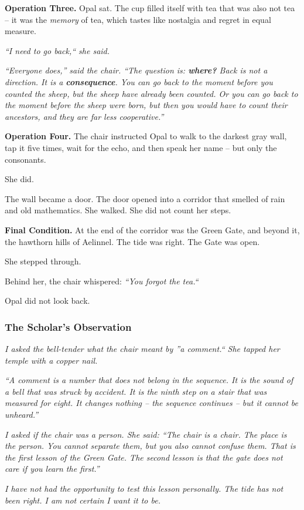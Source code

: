 \documentclass[12pt]{article}
\begin{document}
\textbf{Operation Three.} Opal sat. The cup filled itself with tea that was also not tea -- it was the \textit{memory} of tea, which tastes like nostalgia and regret in equal measure.

\textit{``I need to go back,`` she said.}

\textit{``Everyone does,'' said the chair. ``The question is: \textbf{where?} Back is not a direction. It is a \textbf{consequence}. You can go back to the moment before you counted the sheep, but the sheep have already been counted. Or you can go back to the moment before the sheep were born, but then you would have to count their ancestors, and they are far less cooperative.''}

\textbf{Operation Four.} The chair instructed Opal to walk to the darkest gray wall, tap it five times, wait for the echo, and then speak her name -- but only the consonants.

She did.

The wall became a door. The door opened into a corridor that smelled of rain and old mathematics. She walked. She did not count her steps.

\textbf{Final Condition.} At the end of the corridor was the Green Gate, and beyond it, the hawthorn hills of Aelinnel. The tide was right. The Gate was open.

She stepped through.

Behind her, the chair whispered: \textit{``You forgot the tea.``}

Opal did not look back.

\subsubsection{The Scholar's Observation}
\textit{I asked the bell-tender what the chair meant by ''a comment.`` She tapped her temple with a copper nail.}

\textit{``A comment is a number that does not belong in the sequence. It is the sound of a bell that was struck by accident. It is the ninth step on a stair that was measured for eight. It changes nothing -- the sequence continues -- but it cannot be unheard.''}

\textit{I asked if the chair was a person. She said: ``The chair is a chair. The place is the person. You cannot separate them, but you also cannot confuse them. That is the first lesson of the Green Gate. The second lesson is that the gate does not care if you learn the first.''}

\textit{I have not had the opportunity to test this lesson personally. The tide has not been right. I am not certain I want it to be.}
\end{document}
